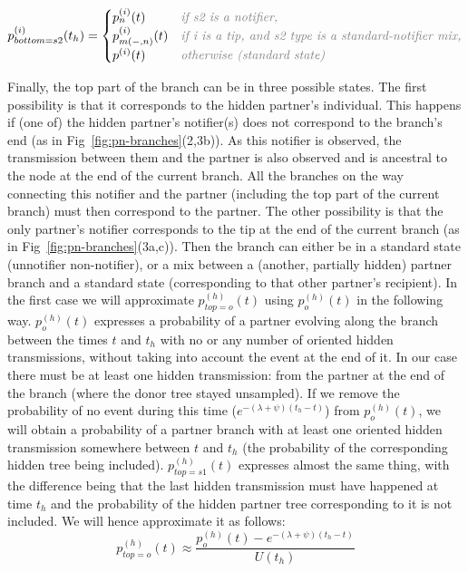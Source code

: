 \documentclass[a4paper,10pt]{article}
\begin{document}
\begin{equation}
p_{bottom=s2}^{(i)}(t_h) = 
\begin{cases}
p_n^{(i)}(t)&\textit{\color{gray} if s2 is a notifier,}\\
p_{m(-,n)}^{(i)}(t)&\textit{\color{gray} if i is a tip, and s2 type is a standard-notifier mix,}\\
p^{(i)}(t)&\textit{\color{gray} otherwise (standard state)}
\end{cases}
\end{equation}

Finally, the top part of the branch can be in three possible states. The first possibility is that it corresponds to the hidden partner's individual. This happens if (one of) the hidden partner's notifier(s) does not correspond to the branch's end (as in Fig~\ref{fig:pn-branches}(2,3b)). As this notifier is observed, the transmission between them and the partner is also observed and is ancestral to the node at the end of the current branch. All the branches on the way connecting this notifier and the partner (including the top part of the current branch) must then correspond to the partner. The other possibility is that the only partner's notifier corresponds to the tip at the end of the current branch (as in Fig~\ref{fig:pn-branches}(3a,c)). Then the branch can either be in a standard state (unnotifier non-notifier), or a mix between a (another, partially hidden) partner branch and a standard state (corresponding to that other partner's recipient). 
In the first case we will approximate $p_{top=o}^{(h)}(t)$ using $p_o^{(h)}(t)$ in the following way. $p_o^{(h)}(t)$ expresses a probability of a partner evolving along the branch between the times $t$ and $t_h$ with no or any number of oriented hidden transmissions, without taking into account the event at the end of it. In our case there must be at least one hidden transmission: from the partner at the end of the branch (where the donor tree stayed unsampled). If we remove the probability of no event during this time ($e^{-(\lambda + \psi)(t_h - t)}$) from $p_o^{(h)}(t)$, we will obtain a probability of a partner branch with at least one oriented hidden transmission somewhere between $t$ and $t_h$ (the probability of the corresponding hidden tree being included). $p_{top=s1}^{(h)}(t)$ expresses almost the same thing, with the difference being that the last hidden transmission must have happened at time $t_h$ and the probability of the hidden partner tree corresponding to it is not included. We will hence approximate it as follows: 
\begin{equation}
p_{top=o}^{(h)}(t) \approx \frac{p_o^{(h)}(t) -e^{-(\lambda + \psi)(t_{h} - t)}}{U(t_{h})}
\end{equation}
\end{document}
